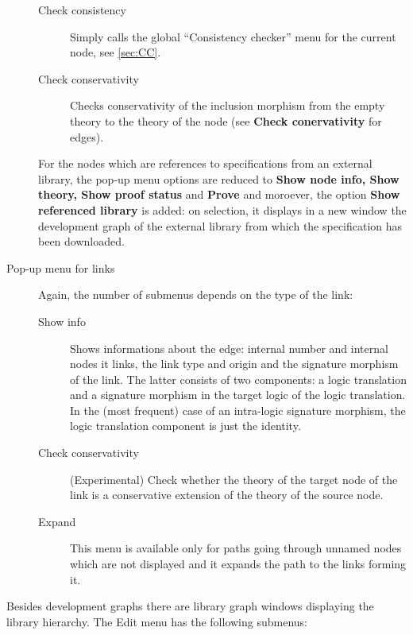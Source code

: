 \documentclass{article}
\begin{document}
\begin{description}
\begin{description}
\item[Check consistency] Simply calls the global ``Consistency checker'' menu
  for the current node, see \ref{sec:CC}.

\item[Check conservativity] Checks conservativity of the inclusion
 morphism from the empty theory to the theory of the node (see
 {\bf Check conervativity} for edges).
\end{description}

For the nodes which are references to specifications from an external library,
the pop-up menu options are reduced to {\bf Show node info, Show theory,
Show proof status} and {\bf Prove} and moroever, the option {\bf Show
referenced library} is added: on selection, it displays in  a new window
the development graph of the external library from which the specification has
been downloaded.

\item[Pop-up menu for links]
Again, the number of submenus depends on the type of the link:
\begin{description}
\item[Show info] Shows informations about the edge: internal number and
internal nodes it links, the link type and origin and the
signature morphism of the link. The latter consists
of two components: a logic translation and a signature morphism in the
target logic of the logic translation.
In the (most frequent) case
of an intra-logic signature morphism, the logic translation component is
just the identity.
\item[Check conservativity] (Experimental) Check whether the
theory of the target node of the link
is a conservative extension of the theory of the source node.
\item[Expand]This menu is available only for paths going through unnamed
nodes which are not displayed and it expands the path to the links forming it.
\end{description}
\end{description}

Besides development graphs there are library graph windows displaying the
library hierarchy. The Edit menu has the following submenus:
\end{document}
